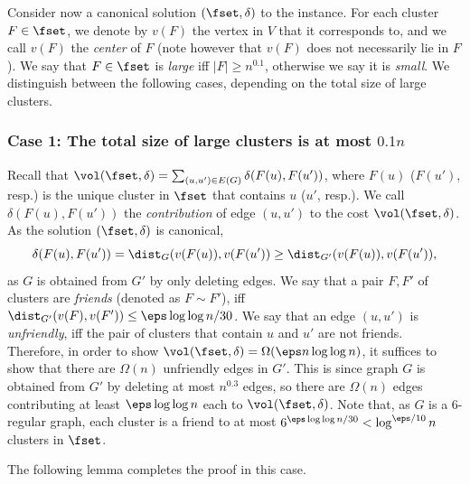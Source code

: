 Consider now a canonical solution $(\fset,\delta)$ to the instance. For each cluster $F\in \fset$, we denote by $v(F)$ the vertex in $V$ that it corresponds to, and we call $v(F)$ the \emph{center} of $F$ (note however that $v(F)$ does not necessarily lie in $F$). We say that $F\in \fset$ is \emph{large} iff $|F|\ge n^{0.1}$, otherwise we say it is \emph{small}. 
We distinguish between the following cases, depending on the total size of large clusters.
%

\subsubsection*{Case 1: The total size of large clusters is at most $0.1n$}

Recall that $\vol(\fset,\delta)=\sum_{(u,u')\in E(G)}\delta(F(u),F(u'))$, where $F(u)$ ($F(u')$, resp.) is the unique cluster in $\fset$ that contains $u$ ($u'$, resp.). We call $\delta(F(u),F(u'))$ the \emph{contribution} of edge $(u,u')$ to the cost $\vol(\fset,\delta)$.
As the solution $(\fset,\delta)$ is canonical, \[\delta(F(u),F(u'))=\dist_G(v(F(u)),v(F(u'))\ge \dist_{G'}(v(F(u)),v(F(u')),\] 
as $G$ is obtained from $G'$ by only deleting edges.
We say that a pair $F,F'$ of clusters are \emph{friends} (denoted as $F\sim F'$), iff $\dist_{G'}(v(F),v(F'))\le \eps \log \log n/30$.
We say that an edge $(u,u')$ is \emph{unfriendly}, iff the pair of clusters that contain $u$ and $u'$ are not friends.
Therefore, in order to show $\vol(\fset,\delta)=\Omega(\eps n\log\log n)$, it suffices to show that there are $\Omega(n)$ unfriendly edges in $G'$. This is since graph $G$ is obtained from $G'$ by deleting at most $n^{0.3}$ edges, so there are $\Omega(n)$ edges contributing at least $\eps \log\log n$ each to $\vol(\fset,\delta)$.
Note that, as $G$ is a $6$-regular graph, each cluster is a friend to at most $6^{\eps \log \log n/30}<\log^{\eps/10} n$ clusters in $\fset$.

The following lemma completes the proof in this case.



